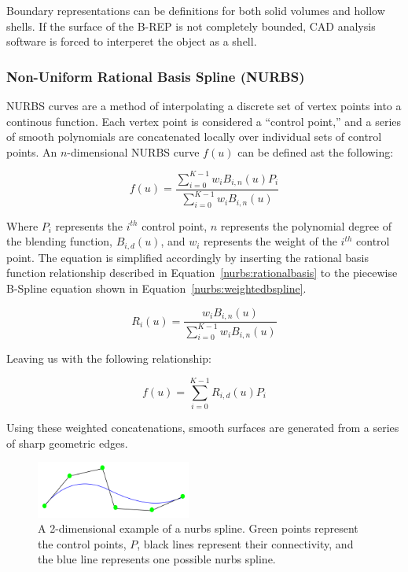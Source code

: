 \documentclass[12pt]{drexelthesis}
\let\Oldsubsubsection\subsubsection
\renewcommand{\subsubsection}{\FloatBarrier\Oldsubsubsection}
\begin{document}
Boundary representations can be definitions for both solid volumes and hollow shells. If the surface of the B-REP is not completely bounded, CAD analysis software is forced to interperet the object as a shell. %

\subsubsection{Non-Uniform Rational Basis Spline (NURBS)}
NURBS curves are a method of interpolating a discrete set of vertex points into a continous function. Each vertex point is considered a ``control point,'' and a series of smooth polynomials are concatenated locally over individual sets of control points. An $n$-dimensional NURBS curve $f(u)$ can be defined ast the following:

\begin{equation}
	f(u) = \frac    {   \sum_{i=0}^{K-1} w_{i} B_{i,n}(u) P_{i} }
				 	{  \sum_{i=0}^{K-1} w_{i} B_{i,n}(u) }
	\label{nurbs:weightedbspline}
 \end{equation}
 
 Where $P_{i}$ represents the $i^{th}$ control point, $n$ represents the polynomial degree of the blending function, $B_{i,d}(u)$, and $w_{i}$ represents the weight of the $i^{th}$ control point. The equation is simplified accordingly by inserting the rational basis function relationship described in Equation~\ref{nurbs:rationalbasis} to the piecewise B-Spline equation shown in Equation~\ref{nurbs:weightedbspline}.
 
\begin{equation}
	R_{i}(u) = \frac    {   w_{i} B_{i,n}(u)}
				 		{  \sum_{i=0}^{K-1} w_{i} B_{i,n}(u) }
	\label{nurbs:rationalbasis}
 \end{equation}
 
 Leaving us with the following relationship:
 
 \begin{equation}
 	f(u) = \sum_{i=0}^{K-1} R_{i,d}(u) P_{i}
\end{equation}

Using these weighted concatenations, smooth surfaces are generated from a series of sharp geometric edges.


\begin{figure}[!ht]
	\centering
		\includegraphics[width=2in]{cadTypes/nurbs.png}
	\caption[Example of a 2-dimensional nurbs spline.]{\centering A 2-dimensional example of a nurbs spline. Green points represent the control points, $P$, black lines represent their connectivity, and the blue line represents one possible nurbs spline.}
\end{figure}
\end{document}

